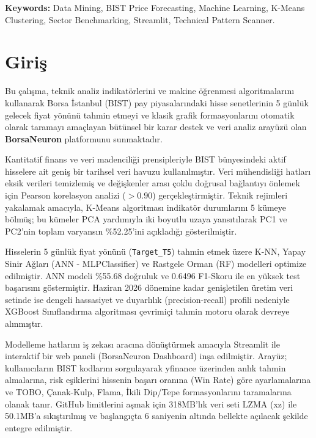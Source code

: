 \documentclass[12pt,a4paper]{report}
\begin{document}
\vspace*{1cm}
\noindent \textbf{Keywords:} Data Mining, BIST Price Forecasting, Machine Learning, K-Means Clustering, Sector Benchmarking, Streamlit, Technical Pattern Scanner.

\newpage

\tableofcontents

\newpage
{}

\chapter{Giriş}

Bu çalışma, teknik analiz indikatörlerini ve makine öğrenmesi algoritmalarını kullanarak Borsa İstanbul (BIST) pay piyasalarındaki hisse senetlerinin 5 günlük gelecek fiyat yönünü tahmin etmeyi ve klasik grafik formasyonlarını otomatik olarak taramayı amaçlayan bütünsel bir karar destek ve veri analiz arayüzü olan \textbf{BorsaNeuron} platformunu sunmaktadır.

Kantitatif finans ve veri madenciliği prensipleriyle BIST bünyesindeki aktif hisselere ait geniş bir tarihsel veri havuzu kullanılmıştır. Veri mühendisliği hatları eksik verileri temizlemiş ve değişkenler arası çoklu doğrusal bağlantıyı önlemek için Pearson korelasyon analizi ($>0.90$) gerçekleştirmiştir. Teknik rejimleri yakalamak amacıyla, K-Means algoritması indikatör durumlarını 5 kümeye bölmüş; bu kümeler PCA yardımıyla iki boyutlu uzaya yansıtılarak PC1 ve PC2'nin toplam varyansın \%52.25'ini açıkladığı gösterilmiştir.

Hisselerin 5 günlük fiyat yönünü (\texttt{Target\_T5}) tahmin etmek üzere K-NN, Yapay Sinir Ağları (ANN - MLPClassifier) ve Rastgele Orman (RF) modelleri optimize edilmiştir. ANN modeli \%55.68 doğruluk ve 0.6496 F1-Skoru ile en yüksek test başarısını göstermiştir. Haziran 2026 dönemine kadar genişletilen üretim veri setinde ise dengeli hassasiyet ve duyarlılık (precision-recall) profili nedeniyle XGBoost Sınıflandırma algoritması çevrimiçi tahmin motoru olarak devreye alınmıştır.

Modelleme hatlarını iş zekası aracına dönüştürmek amacıyla Streamlit ile interaktif bir web paneli (BorsaNeuron Dashboard) inşa edilmiştir. Arayüz; kullanıcıların BIST kodlarını sorgulayarak yfinance üzerinden anlık tahmin almalarına, risk eşiklerini hissenin başarı oranına (Win Rate) göre ayarlamalarına ve TOBO, Çanak-Kulp, Flama, İkili Dip/Tepe formasyonlarını taramalarına olanak tanır. GitHub limitlerini aşmak için 318MB'lık veri seti LZMA (xz) ile 50.1MB'a sıkıştırılmış ve başlangıçta 6 saniyenin altında bellekte açılacak şekilde entegre edilmiştir.
\end{document}

